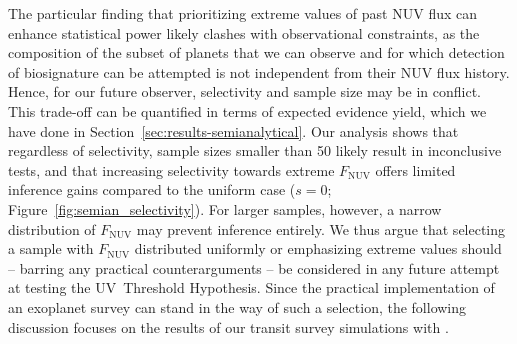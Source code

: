 \documentclass[twocolumn,twocolappendix,linenumbers]{aastex631}
\begin{document}
The particular finding that prioritizing extreme values of past \gls{NUV} flux can enhance statistical power likely clashes with observational constraints, as the composition of the subset of planets that we can observe and for which detection of biosignature can be attempted is not independent from their \gls{NUV} flux history.
Hence, for our future observer, selectivity and sample size may be in conflict.
This trade-off can be quantified in terms of expected evidence yield, which we have done in Section~\ref{sec:results-semianalytical}.
Our analysis shows that regardless of selectivity, sample sizes smaller than 50 likely result in inconclusive tests, and that increasing selectivity towards extreme $F_{\mathrm{NUV}}$ offers limited inference gains compared to the uniform case ($s=0$; Figure~\ref{fig:semian_selectivity}).
For larger samples, however, a narrow distribution of $F_{\mathrm{NUV}}$ may prevent inference entirely.
We thus argue that selecting a sample with $F_{\mathrm{NUV}}$ distributed uniformly or emphasizing extreme values should -- barring any practical counterarguments -- be considered in any future attempt at testing the UV~Threshold Hypothesis.
Since the practical implementation of an exoplanet survey can stand in the way of such a selection, the following discussion focuses on the results of our transit survey simulations with \bioverse.



\end{document}
